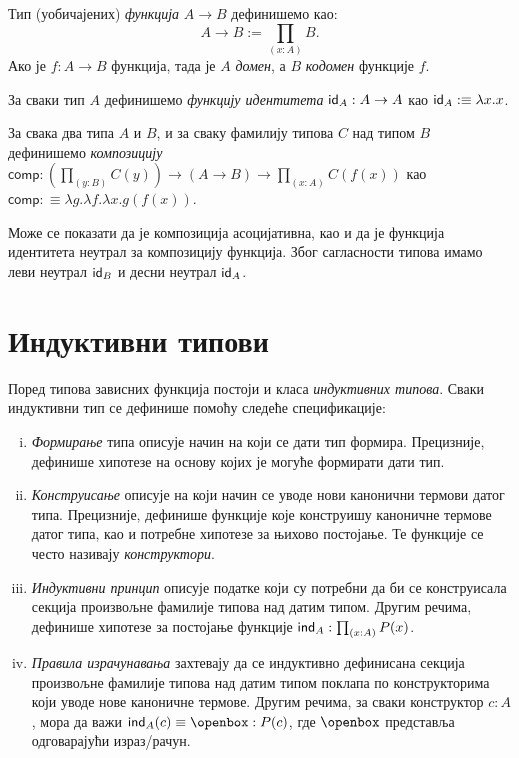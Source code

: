 \documentclass[12pt,oneside]{memoir}
\begin{document}
\begin{definition}
    Тип (уобичајених) \emph{функција} $A \to B$ дефинишемо као:
    \[A \to B:= \prod_{(x:A)} B.\]
    Ако је $f : A \to B$ функција, тада је $A$ \emph{домен}, а $B$ \emph{кодомен} функције $f$. 
\end{definition}

\begin{definition}
\label{def:id}
    За сваки тип $A$ дефинишемо \emph{функцију идентитета} $\mathsf{id}_{A} : A \to A$ као $\mathsf{id}_{A} :\equiv \lambda x.x$.
\end{definition}

\begin{definition}
\label{def:comp}
    За свака два типа $A$ и $B$, и за сваку фамилију типова $C$ над типом $B$ дефинишемо \emph{композицију} $\mathsf{comp} : (\prod_{(y : B)} C (y)) \to (A \to B) \to \prod_{(x : A)} C (f (x))$ као $\mathsf{comp} :\equiv \lambda g.\lambda f.\lambda x.g(f(x))$.
\end{definition}
Може се показати да је композиција асоцијативна, као и да је функција идентитета неутрал за композицију функција. Због сагласности типова имамо леви неутрал $\mathsf{id}_{B}$ и десни неутрал $\mathsf{id}_{A}$.

\newpage%
\section{Индуктивни типови}
\label{sec:indtyp}

Поред типова зависних функција постоји и класа \emph{индуктивних типова}. Сваки индуктивни тип се дефинише помоћу следеће спецификације: 

\begin{enumerate}[(i)]
    \item{\emph{Формирање} типа описује начин на који се дати тип формира. Прецизније, дефинише хипотезе на основу којих је могуће формирати дати тип.}
    \item{\emph{Конструисање} описује на који начин се уводе нови канонични термови датог типа. Прецизније, дефинише функције које конструишу каноничне термове датог типа, као и потребне хипотезе за њихово постојање. Те функције се често називају \emph{конструктори}.}
    \item{\emph{Индуктивни принцип} описује податке који су потребни да би се конструисала секција произвољне фамилије типова над датим типом. Другим речима, дефинише хипотезе за постојање функције $\mathsf{ind}_{A} : \prod_{(x : A)} P(x)$.}
    \item{\emph{Правила израчунавања} захтевају да се индуктивно дефинисана секција произвољне фамилије типова над датим типом поклапа по конструкторима који уводе нове каноничне термове. Другим речима, за сваки конструктор $c : A$, мора да важи $\ind{A}(c) \equiv \openbox : P(c)$, где $\openbox$ представља одговарајући израз/рачун.}
\end{enumerate}
\end{document}
